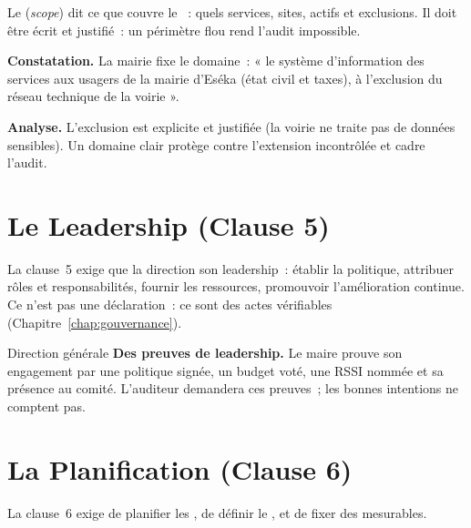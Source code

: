 Le  (\emph{scope}) dit ce que couvre le
~: quels services, sites, actifs et exclusions. Il doit être écrit
et justifié~: un périmètre flou rend l'audit impossible.

\begin{boxprocedure}
\textbf{Constatation.} La mairie fixe le domaine~: « le système d'information
des services aux usagers de la mairie d'Eséka (état civil et taxes), à
l'exclusion du réseau technique de la voirie ».

\medskip
\textbf{Analyse.} L'exclusion est explicite et justifiée (la voirie ne traite
pas de données sensibles). Un domaine clair protège contre l'extension
incontrôlée et cadre l'audit.
\end{boxprocedure}

\section{Le Leadership (Clause 5)}
\label{sec:c08-leadership}

La clause~5 exige que la direction  son leadership~: établir
la politique, attribuer rôles et responsabilités, fournir les ressources,
promouvoir l'amélioration continue. Ce n'est pas une déclaration~: ce sont des
actes vérifiables (Chapitre~\ref{chap:gouvernance}).

\begin{boxmetier}{Direction générale}
\textbf{Des preuves de leadership.} Le maire prouve son engagement par une
politique signée, un budget voté, une RSSI nommée et sa présence au comité.
L'auditeur demandera ces preuves~; les bonnes intentions ne comptent pas.
\end{boxmetier}

\section{La Planification (Clause 6)}
\label{sec:c08-planif}

\begin{boxdef}
La clause~6 exige de planifier les , de définir le , et de fixer des 
mesurables.
\end{boxdef}

